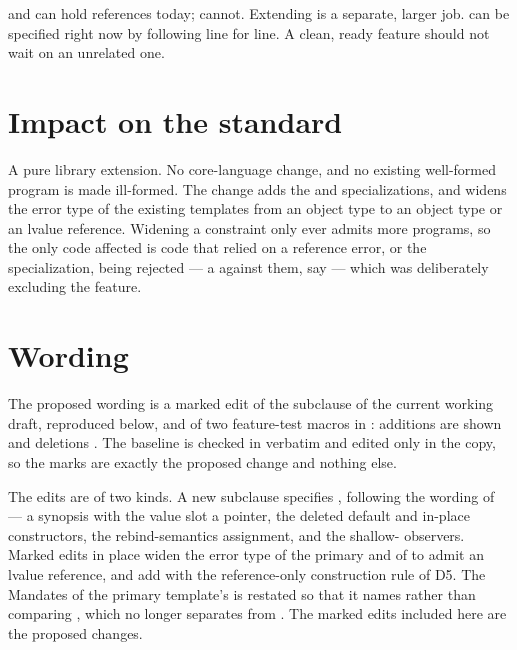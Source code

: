 \documentclass[a4paper,10pt,oneside,openany,final,article]{memoir}
\begin{document}
 and  can hold references today; 
cannot. Extending  is a separate, larger job.
 can be specified right now by following
 line for line. A clean, ready feature should not wait on
an unrelated one.

\chapter{Impact on the standard}

A pure library extension. No core-language change, and no existing well-formed
program is made ill-formed. The change adds the  and
 specializations, and widens the error type of the
existing  templates from an object type to an object type or an
lvalue reference. Widening a constraint only ever admits more programs, so the
only code affected is code that relied on a reference error, or the
 specialization, being rejected --- a
 against them, say --- which was deliberately excluding the
feature.

\chapter{Wording}

The proposed wording is a marked edit of the \tcode{[expected]} subclause of the
current working draft, reproduced below, and of two feature-test macros in
: additions are shown 
and deletions . The baseline is checked in verbatim and
edited only in the copy, so the marks are exactly the proposed change and
nothing else.

The \tcode{[expected]} edits are of two kinds. A new  subclause specifies
, following the  wording of
\cite{P2988R12} --- a synopsis with the value slot a pointer, the deleted
default and in-place constructors, the rebind-semantics assignment, and the
shallow- observers. Marked edits in place widen the error type of
the primary  and of  to admit an
lvalue reference, and add  with the reference-only
construction rule of D5. The Mandates of the primary template's
 is restated so that it names  rather
than comparing , which no longer separates
 from . The marked edits
included here are the proposed
changes.
\end{document}
